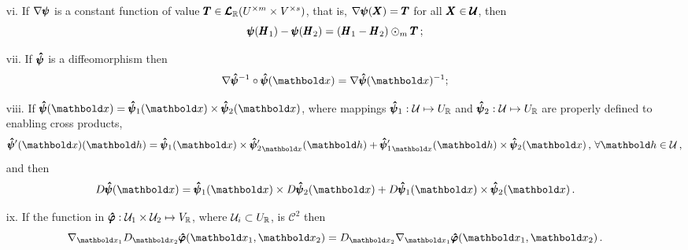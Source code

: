 \begin{itemize}
\begin{equation}
	\end{equation}
	\item[vi.] If $\nabla\pmb{\psi}$ is a constant function of value $\pmb{T}\in\pmb{\mathcal{L}}_{\mathbb{R}}(U^{\times m}\times V^{\times s})$, that is, $\nabla\pmb{\psi}(\pmb{X})=\pmb{T}$ for all $\pmb{X}\in\pmb{\mathcal{U}}$, then 
	\begin{equation}\label{eq:gradConst}
	\pmb{\psi}(\pmb{H}_1)-\pmb{\psi}(\pmb{H}_2)=(\pmb{H}_1-\pmb{H}_2)\odot_m\pmb{T}\,;
	\end{equation}
	\item[vii.] If $\pmb{\hat\psi}$ is a diffeomorphism then 
	\begin{equation}\label{eq:gradDiffeo2}
	\fua{\nabla\tnr{\hat\psi}^{-1}\circ\tnr{\hat\psi}}{\vto{x}}=\fua{\nabla\tnr{\hat\psi}}{\vto{x}}^{-1};
	\end{equation}
	\item[viii.] If $\fua{\tnr{\hat\psi}}{\vto{x}}=\fua{\tnr{\hat\psi}_1}{\vto{x}}\times\fua{\tnr{\hat\psi}_2}{\vto{x}}$, where mappings  $\pmb{\hat\psi}_1 : {\mathcal{U}} \mapsto U_{\mathbb{R}}$ and $\pmb{\hat\psi}_2 : {\mathcal{U}} \mapsto U_{\mathbb{R}}$ are properly defined to enabling cross products, 
\begin{equation}\label{eq:crossRule}
\fua{\tnr{\hat\psi}'(\vto{x})}{\vto{h}} = \fua{\tnr{\hat\psi}_1}{\vto{x}}\times\fua{{\tnr{\hat\psi}_2'}_{\vto{x}}}{\vto{h}} + \fua{{\tnr{\hat\psi}_1'}_{\vto{x}}}{\vto{h}} \times \fua{\tnr{\hat\psi}_2}{\vto{x}}\,,\,\forall \vto{h}\in\mathcal{U}\,,
\end{equation}
and then 
	\begin{equation}\label{eq:prop3Grad}
	\fua{D\tnr{\hat\psi}}{\vto{x}} = \fua{\tnr{\hat\psi}_1}{\vto{x}}\times\fua{D\tnr{\hat\psi}_2}{\vto{x}}+\fua{D\tnr{\hat\psi}_1}{\vto{x}}\times\fua{\tnr{\hat\psi}_2}{\vto{x}}\,.
	\end{equation}
	\item[ix.] If the function in $\pmb{\hat{\varphi}} : {\mathcal{U}}_1\times{\mathcal{U}}_2 \mapsto V_{\mathbb{R}}$, where ${\mathcal{U}}_i\subset U_{\mathbb{R}}$, is $\mathcal{C}^2$ then
\begin{equation}
\nabla_{\vto{x}_1}D_{\vto{x}_2}\tnr{\hat{\varphi}}(\vto{x}_1,\vto{x}_2)=D_{\vto{x}_2}\nabla_{\vto{x}_1}\tnr{\hat{\varphi}}(\vto{x}_1,\vto{x}_2)\,.
\end{equation}
\end{itemize}

